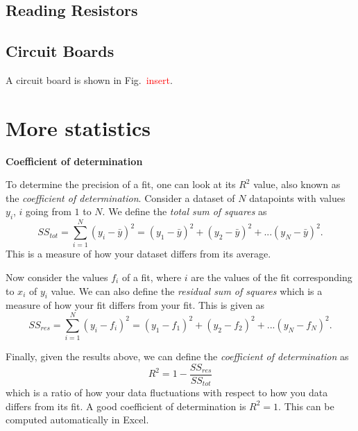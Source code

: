 \documentclass[12pt]{report}
\def \todo #1{\textcolor{red}{#1}}
\begin{document}
{}
\section*{Reading Resistors}

{}
\section*{Circuit Boards}
A circuit board is shown in Fig.~\todo{insert}. 

{}
\chapter*{More statistics}

\noindent \large \textbf{Coefficient of determination} \normalsize

To determine the precision of a fit, one can look at its $R^2$ value, also known as the \textit{coefficient of determination}. Consider a dataset of $N$ datapoints with values $y_i$, $i$ going from $1$ to $N$. We define the \textit{total sum of squares} as
\begin{equation}
SS_{tot} = \displaystyle \sum_{i=1}^N (y_i - \bar{y})^2 = (y_1 - \bar{y})^2 + (y_2 - \bar{y})^2 + ... (y_N - \bar{y})^2.
\end{equation}
This is a measure of how your dataset differs from its average.

Now consider the values $f_i$ of a fit, where $i$ are the values of the fit corresponding to $x_i$ of $y_i$ value. We can also define the \textit{residual sum of squares} which is a measure of how your fit differs from your fit. This is given as
\begin{equation}
SS_{res} = \displaystyle \sum_{i=1}^{N} (y_i - f_i)^2 = (y_1 - f_1)^2 + (y_2 - f_2)^2 + ... (y_N - f_N)^2.
\end{equation}

Finally, given the results above, we can define the \textit{coefficient of determination} as
\begin{equation}
R^2 = 1 - \frac{SS_{res}}{SS_{tot}}
\end{equation}
which is a ratio of how your data fluctuations with respect to how you data differs from its fit. A good coefficient of determination is $R^2=1$. This can be computed automatically in Excel.



%
%

\begin{appendices}

\end{appendices}
\end{document}
